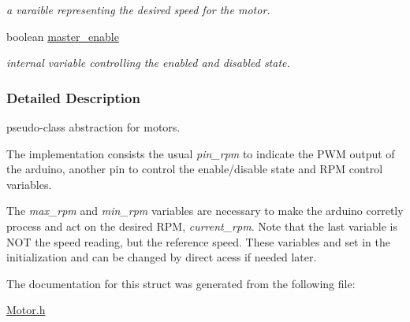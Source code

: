 \begin{DoxyCompactItemize}
\begin{DoxyCompactList}\small\item\em a varaible representing the desired speed for the motor. \end{DoxyCompactList}\item 
\hypertarget{struct_motor_af14714be1f64a2dbe756a16c7f9b2e60}{boolean \hyperlink{struct_motor_af14714be1f64a2dbe756a16c7f9b2e60}{master\+\_\+enable}}\label{struct_motor_af14714be1f64a2dbe756a16c7f9b2e60}

\begin{DoxyCompactList}\small\item\em internal variable controlling the enabled and disabled state. \end{DoxyCompactList}\end{DoxyCompactItemize}


\subsubsection{Detailed Description}
pseudo-\/class abstraction for motors.

The implementation consists the usual {\itshape pin\+\_\+rpm} to indicate the P\+W\+M output of the arduino, another pin to control the enable/disable state and R\+P\+M control variables.

The {\itshape max\+\_\+rpm} and {\itshape min\+\_\+rpm} variables are necessary to make the arduino corretly process and act on the desired R\+P\+M, {\itshape current\+\_\+rpm}. Note that the last variable is N\+O\+T the speed reading, but the reference speed. These variables and set in the initialization and can be changed by direct acess if needed later. 

The documentation for this struct was generated from the following file\+:\begin{DoxyCompactItemize}
\item 
\hyperlink{_motor_8h}{Motor.\+h}\end{DoxyCompactItemize}

